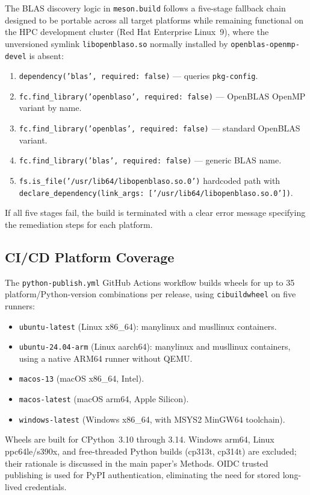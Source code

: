 \documentclass[12pt,a4paper]{article}
\begin{document}
The BLAS discovery logic in \texttt{meson.build} follows a five-stage fallback chain designed to be portable across all target platforms while remaining functional on the HPC development cluster (Red Hat Enterprise Linux~9), where the unversioned symlink \texttt{libopenblaso.so} normally installed by \texttt{openblas-openmp-devel} is absent:
\begin{enumerate}
\item \texttt{dependency('blas', required: false)} --- queries \texttt{pkg-config}.
\item \texttt{fc.find\_library('openblaso', required: false)} --- OpenBLAS OpenMP variant by name.
\item \texttt{fc.find\_library('openblas', required: false)} --- standard OpenBLAS variant.
\item \texttt{fc.find\_library('blas', required: false)} --- generic BLAS name.
\item \texttt{fs.is\_file('/usr/lib64/libopenblaso.so.0')} hardcoded path with \texttt{declare\_dependency(link\_args: ['/usr/lib64/libopenblaso.so.0'])}.
\end{enumerate}

If all five stages fail, the build is terminated with a clear error message specifying the remediation steps for each platform.

\subsection{CI/CD Platform Coverage}

The \texttt{python-publish.yml} GitHub Actions workflow builds wheels for up to 35 platform/Python-version combinations per release, using \texttt{cibuildwheel} on five runners:
\begin{itemize}
\item \texttt{ubuntu-latest} (Linux x86\_64): manylinux and musllinux containers.
\item \texttt{ubuntu-24.04-arm} (Linux aarch64): manylinux and musllinux containers, using a native ARM64 runner without QEMU.
\item \texttt{macos-13} (macOS x86\_64, Intel).
\item \texttt{macos-latest} (macOS arm64, Apple Silicon).
\item \texttt{windows-latest} (Windows x86\_64, with MSYS2 MinGW64 toolchain).
\end{itemize}

Wheels are built for CPython~3.10 through 3.14. Windows arm64, Linux ppc64le/s390x, and free-threaded Python builds (cp313t, cp314t) are excluded; their rationale is discussed in the main paper's Methods. OIDC trusted publishing is used for PyPI authentication, eliminating the need for stored long-lived credentials.
\end{document}
